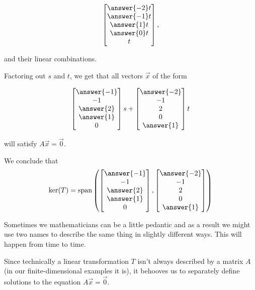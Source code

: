 \documentclass{ximera}
\begin{document}
\begin{example}
\begin{explanation}
$$\begin{bmatrix}\answer{-2}t\\\answer{-1}t\\\answer{1}t\\\answer{0}t\\t\end{bmatrix},$$

and their linear combinations.

Factoring out $s$ and $t$, we get that all vectors $\vec{x}$ of the form

$$\begin{bmatrix}\answer{-1}\\-1\\\answer{2}\\\answer{1}\\0\end{bmatrix}s+\begin{bmatrix}\answer{-2}\\-1\\2\\0\\\answer{1}\end{bmatrix}t$$

will satisfy $A\vec{x}=\vec{0}$.
 
We conclude that
$$\mbox{ker}(T)=\mbox{span}\left(\begin{bmatrix}\answer{-1}\\-1\\\answer{2}\\\answer{1}\\0\end{bmatrix},\begin{bmatrix}\answer{-2}\\-1\\2\\0\\\answer{1}\end{bmatrix}\right)$$
\end{explanation}

\end{example}

Sometimes we mathematicians can be a little pedantic and as a result we might use two names to describe the same thing in slightly different ways. This will happen from time to time. 

Since technically a linear transformation $T$ isn't always described by a matrix $A$ (in our finite-dimensional examples it is), it behooves us to separately define solutions to the equation $A\vec{x}=\vec{0}$.
\end{document}
